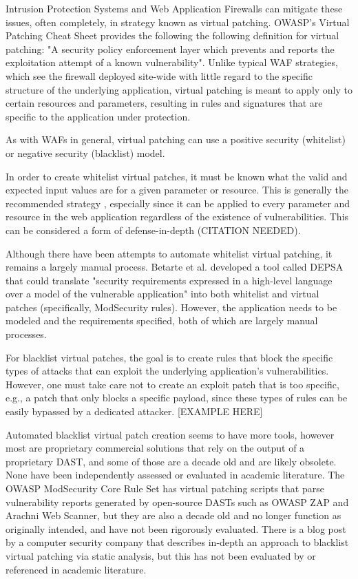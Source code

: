 Intrusion Protection Systems and Web Application Firewalls can mitigate these issues, often completely, in strategy known as virtual patching. OWASP's Virtual Patching Cheat Sheet \cite{virtualpatchingcheat} provides the following the following definition for virtual patching:
"A security policy enforcement layer which prevents and reports the exploitation attempt of a known vulnerability". 
Unlike typical WAF strategies, which see the firewall deployed site-wide with little regard to the specific structure of the underlying application, virtual patching is meant to apply only to certain resources and parameters, resulting in rules and signatures that are specific to the  application under protection. 

As with WAFs in general, virtual patching can use a positive security (whitelist) or negative security (blacklist) model. 

In order to create whitelist virtual patches, it must be known what the valid and expected input values are for a given parameter or resource. This is generally the recommended strategy \cite{virtualpatchingcheat}, especially since it can be applied to every parameter and resource in the web application regardless of the existence of vulnerabilities. This can be considered a form of defense-in-depth (CITATION NEEDED). 

Although there have been attempts to automate whitelist virtual patching, it remains a largely manual process. Betarte et al. \cite{betarte_towards_2016} developed a tool called DEPSA that could translate "security requirements expressed in a high-level language over a model of the vulnerable application" into both whitelist and virtual patches (specifically, ModSecurity rules). However, the application needs to be modeled and the requirements specified, both of which are largely manual processes.

For blacklist virtual patches, the goal is to create rules that block the specific types of attacks that can exploit the underlying application's vulnerabilities. However, one must take care not to create an exploit patch that is too specific, e.g., a patch that only blocks a specific payload, since these types of rules can be easily bypassed by a dedicated attacker. [EXAMPLE HERE]

Automated blacklist virtual patch creation seems to have more tools, however most are proprietary commercial solutions that rely on the output of a proprietary DAST, and some of those are a decade old and are likely obsolete. None have been independently assessed or evaluated in academic literature. The OWASP ModSecurity Core Rule Set has virtual patching scripts that parse vulnerability reports generated by open-source DASTs such as OWASP ZAP and Arachni Web Scanner, but they are also a decade old and no longer function as originally intended, and have not been rigorously evaluated. There is a blog post by a computer security company that describes in-depth an approach to blacklist virtual patching via static analysis, but this has not been evaluated by or referenced in academic literature.

